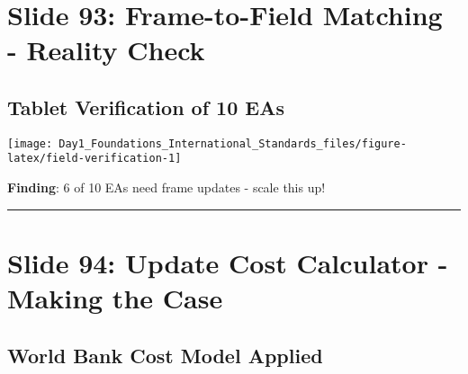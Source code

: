 \documentclass[
]{article}
\begin{document}
\section{Slide 93: Frame-to-Field Matching - Reality
Check}\label{slide-93-frame-to-field-matching---reality-check}

\subsection{Tablet Verification of 10
EAs}\label{tablet-verification-of-10-eas}

\texttt{[image: Day1\_Foundations\_International\_Standards\_files/figure-latex/field-verification-1]}

\textbf{Finding}: 6 of 10 EAs need frame updates - scale this up!

\begin{center}\rule{0.5\linewidth}{0.5pt}\end{center}

\section{Slide 94: Update Cost Calculator - Making the
Case}\label{slide-94-update-cost-calculator---making-the-case}

\subsection{World Bank Cost Model
Applied}\label{world-bank-cost-model-applied-1}
\end{document}
